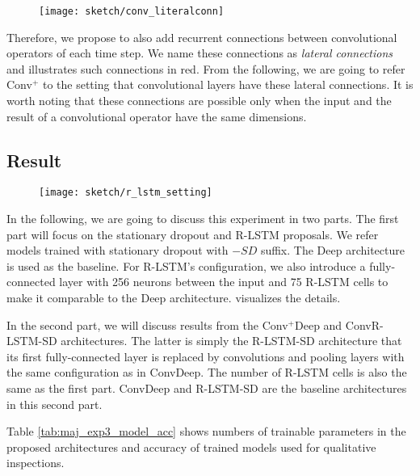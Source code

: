  \begin{figure}
\centering
\texttt{[image: sketch/conv\_literalconn]}
\label{fig:conv_literalconn}
\end{figure}

	Therefore, we propose to also add recurrent connections between convolutional operators of each time step. We name these connections as \textit{lateral connections} and \addfigure{\ref{fig:conv_literalconn}} illustrates such connections in red. From the following, we are going to refer Conv$^+$ to the setting that convolutional layers have these  lateral connections.  It is worth noting that these connections are possible only when the input and the result of a convolutional operator have the same dimensions.

\subsection{Result}

\begin{figure}
\centering
\texttt{[image: sketch/r\_lstm\_setting]}
\label{fig:rlstm_setting}
\end{figure}

In the following, we are going to discuss this experiment in two parts. The first part will focus on the stationary dropout and R-LSTM proposals. We refer models trained with stationary dropout with $-SD$ suffix. The Deep architecture is used as the baseline.  For R-LSTM's configuration, we also introduce a fully-connected layer with 256 neurons between the input and 75 R-LSTM cells to make it comparable to the Deep architecture. \addfigure{\ref{fig:rlstm_setting}} visualizes the details.


In the second part, we will discuss results from the Conv$^+$Deep and ConvR-LSTM-SD architectures. The latter  is simply the R-LSTM-SD architecture that its first fully-connected layer is replaced by convolutions and pooling layers with the same configuration as in ConvDeep. The number of R-LSTM cells is also the same as the first part. ConvDeep and R-LSTM-SD are the baseline architectures in this second part.


Table \ref{tab:maj_exp3_model_acc} shows numbers of trainable parameters in the proposed architectures and accuracy of trained models used for qualitative inspections.

